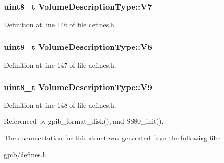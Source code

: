 \subsubsection[{\texorpdfstring{V7}{V7}}]{\setlength{\rightskip}{0pt plus 5cm}uint8\+\_\+t Volume\+Description\+Type\+::\+V7}\hypertarget{structVolumeDescriptionType_a5d057bc3e9f6537234dfb904c740c68f}{}\label{structVolumeDescriptionType_a5d057bc3e9f6537234dfb904c740c68f}


Definition at line 146 of file defines.\+h.

\subsubsection[{\texorpdfstring{V8}{V8}}]{\setlength{\rightskip}{0pt plus 5cm}uint8\+\_\+t Volume\+Description\+Type\+::\+V8}\hypertarget{structVolumeDescriptionType_a86597a2edf96558d4176afc6ac3a0565}{}\label{structVolumeDescriptionType_a86597a2edf96558d4176afc6ac3a0565}


Definition at line 147 of file defines.\+h.

\subsubsection[{\texorpdfstring{V9}{V9}}]{\setlength{\rightskip}{0pt plus 5cm}uint8\+\_\+t Volume\+Description\+Type\+::\+V9}\hypertarget{structVolumeDescriptionType_a8db8489c65036975ec2ebe01734310be}{}\label{structVolumeDescriptionType_a8db8489c65036975ec2ebe01734310be}


Definition at line 148 of file defines.\+h.



Referenced by gpib\+\_\+format\+\_\+disk(), and S\+S80\+\_\+init().



The documentation for this struct was generated from the following file\+:\begin{DoxyCompactItemize}
\item 
gpib/\hyperlink{defines_8h}{defines.\+h}\end{DoxyCompactItemize}
